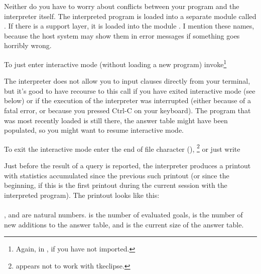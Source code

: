 Neither do you have to worry about conflicts between your program and the
interpreter itself. The interpreted program is loaded into a separate module
called .  If there is a support layer, it is loaded into
the module .  I mention these names, because the host system
may show them in error messages if something goes horribly wrong.


%

To just enter interactive mode (without loading a new program)
invoke\footnote{
  Again,  in \Eclipse{}, if you have not imported.}\\
\ind{}

The interpreter does not allow you to input clauses directly from your
terminal, but it's good to have recourse to this call if you have exited
interactive mode (see below) or if the execution of the interpreter was
interrupted (either because of a fatal error, or because you pressed Ctrl-C
on your keyboard). The program that was most recently loaded is still there,
the answer table might have been populated, so you might want to resume
interactive mode.


%

To exit the interactive mode enter the end of file character
(),%
\footnote{
   appears not to work with tkeclipse.}
or just write\\
\ind{}


%

Just before the result of a query is reported, the interpreter produces a
printout with statistics accumulated since the previous
such printout (or since the beginning, if this is the first printout during
the current session with the interpreted program). The printout looks like
this:\\
\ind{}\\
, and  are natural numbers.  is the number of
evaluated goals,  is the number of new additions to the answer table,
and  is the current size of the answer table.

